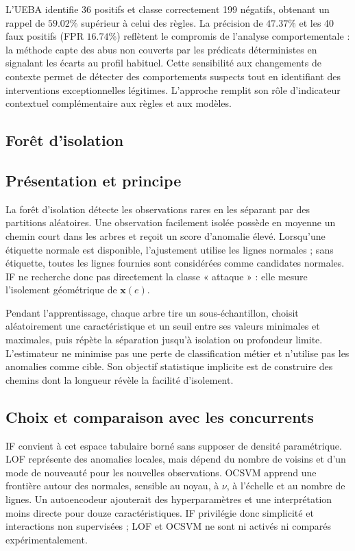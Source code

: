 \documentclass[11pt,a4paper,oneside]{report}
\theoremstyle{definition}
\theoremstyle{plain}
\begin{document}
L'UEBA identifie 36 positifs et classe correctement 199 négatifs, obtenant un
rappel de $59.02\%$ supérieur à celui des règles. La précision de $47.37\%$ et
les 40 faux positifs (FPR $16.74\%$) reflètent le compromis de l'analyse
comportementale : la méthode capte des abus non couverts par les prédicats
déterministes en signalant les écarts au profil habituel. Cette sensibilité aux
changements de contexte permet de détecter des comportements suspects tout en
identifiant des interventions exceptionnelles légitimes. L'approche remplit son
rôle d'indicateur contextuel complémentaire aux règles et aux modèles.

\subsection{Forêt d'isolation}
\label{sec:ai-ro-if}

\subsection*{Présentation et principe}

La forêt d'isolation détecte les observations rares en les séparant par des partitions aléatoires. Une observation facilement isolée possède en moyenne un chemin court dans les arbres et reçoit un score d'anomalie élevé. Lorsqu'une étiquette normale est disponible, l'ajustement utilise les lignes normales ; sans étiquette, toutes les lignes fournies sont considérées comme candidates normales. IF ne recherche donc pas directement la classe « attaque » : elle mesure l'isolement géométrique de $\mathbf{x}(e)$.

Pendant l'apprentissage, chaque arbre tire un sous-échantillon, choisit
aléatoirement une caractéristique et un seuil entre ses valeurs minimales et
maximales, puis répète la séparation jusqu'à isolation ou profondeur limite.
L'estimateur ne minimise pas une perte de classification métier et n'utilise
pas les anomalies comme cible. Son objectif statistique implicite est de
construire des chemins dont la longueur révèle la facilité d'isolement.

\subsection*{Choix et comparaison avec les concurrents}

IF convient à cet espace tabulaire borné sans supposer de densité paramétrique. LOF représente des anomalies locales, mais dépend du nombre de voisins et d'un mode de nouveauté pour les nouvelles observations. OCSVM apprend une frontière autour des normales, sensible au noyau, à $\nu$, à l'échelle et au nombre de lignes. Un autoencodeur ajouterait des hyperparamètres et une interprétation moins directe pour douze caractéristiques. IF privilégie donc simplicité et interactions non supervisées ; LOF et OCSVM ne sont ni activés ni comparés expérimentalement.
\end{document}
